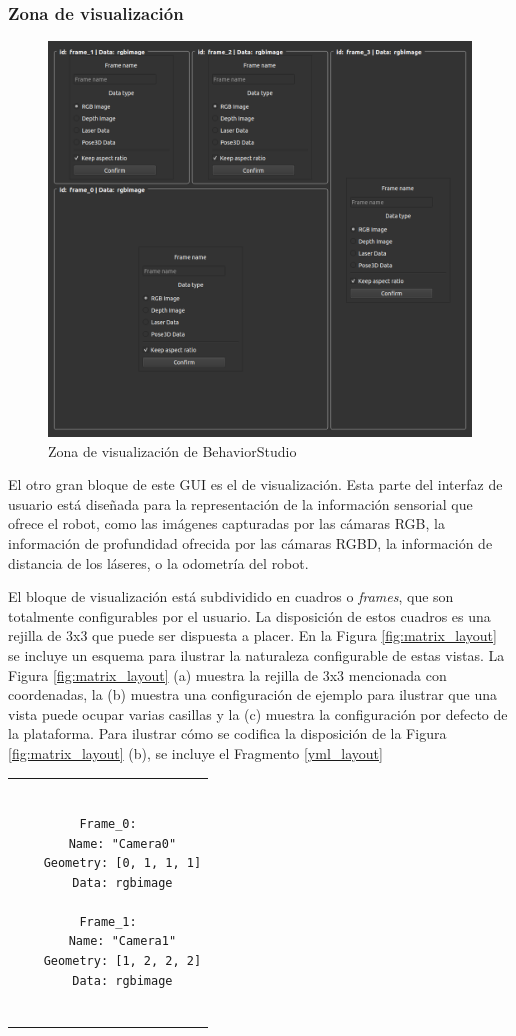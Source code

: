\subsubsection{Zona de visualización}

\begin{figure}
  \centering
  \includegraphics[width=.6\linewidth]{img/layout}
  \caption{Zona de visualización de BehaviorStudio}
  \label{fig:layout}
\end{figure}

El otro gran bloque de este GUI es el de visualización. Esta parte del interfaz de usuario está diseñada para la representación de la información sensorial que ofrece el robot, como las imágenes capturadas por las cámaras RGB, la información de profundidad ofrecida por las cámaras RGBD, la información de distancia de los láseres, o la odometría del robot. 

El bloque de visualización está subdividido en cuadros o \textit{frames}, que son totalmente configurables por el usuario. La disposición de estos cuadros es una rejilla de 3x3 que puede ser dispuesta a placer. En la Figura \ref{fig:matrix_layout} se incluye un esquema para ilustrar la naturaleza configurable de estas vistas. La Figura \ref{fig:matrix_layout} (a) muestra la rejilla de 3x3 mencionada con coordenadas, la (b) muestra una configuración de ejemplo para ilustrar que una vista puede ocupar varias casillas y la (c) muestra la configuración por defecto de la plataforma. Para ilustrar cómo se codifica la disposición de la Figura \ref{fig:matrix_layout} (b), se incluye el Fragmento \ref{yml_layout}

\begin{tabular}{c}
\begin{lstlisting}[caption={Ejemplo de configuración de la visualización},captionpos=b,label=yml_layout] 

Frame_0:
    Name: "Camera0"
    Geometry: [0, 1, 1, 1]
    Data: rgbimage

Frame_1:
    Name: "Camera1"
    Geometry: [1, 2, 2, 2]
    Data: rgbimage
    
\end{lstlisting}
\end{tabular}

